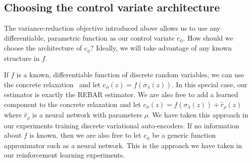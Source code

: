 \documentclass{article}
\newcommand{\E}{\mathbb{E}}
\newcommand{\PT}{\frac{\partial}{\partial \theta}}
\begin{document}
\subsection{Choosing the control variate architecture}
The variance-reduction objective introduced above allows us to use any differentiable, parametric function as our control variate $c_\phi$. 
How should we choose the architecture of $c_\phi$?
Ideally, we will take advantage of any known structure in $f$.

If $f$ is a known, differentiable function of discrete random variables, we can use the concrete relaxation~\cite{maddison2016concrete} and let $c_\phi(z) = f(\sigma_\lambda(z))$.
In this special case, our estimator is exactly the REBAR estimator.
We are also free to add a learned component to the concrete relaxation and let $c_\phi(z) = f(\sigma_\lambda(z)) + \hat{r}_\rho(z)$ where $\hat{r}_\rho$ is a neural network with parameters $\rho$.
We have taken this approach in our experiments training discrete variational auto-encoders.
If no information about $f$ is known, then we are also free to let $c_\phi$ be a generic function approximator such as a neural network.
This is the approach we have taken in our reinforcement learning experiments.
\end{document}
